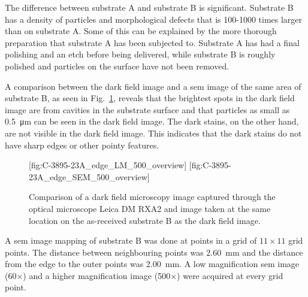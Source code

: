 The difference between substrate A and substrate B is significant. Substrate B has a density of particles and morphological defects that is 100-1000 times larger than on substrate A. Some of this can be explained by the more thorough preparation that substrate A has been subjected to. Substrate A has had a final polishing and an etch before being delivered, while substrate B is roughly polished and particles on the surface have not been removed.

A comparison between the dark field image and a \ac{sem} image of the same area of substrate B, as seen in Fig.~\ref{fig:LM_SEM_C3895}, reveals that the brightest spots in the dark field image are from cavities in the substrate surface and that particles as small as \SI{0.5}{\micro\metre} can be seen in the dark field image. The dark stains, on the other hand, are not visible in the dark field image. This indicates that the dark stains do not have sharp edges or other pointy features.

\begin{figure}[htbp]
    \centering
    [fig:C-3895-23A_edge_LM_500_overview]
    \hfill
    [fig:C-3895-23A_edge_SEM_500_overview]
    \caption[Comparison of dark field microscopy and \ac{sem} images.]{Comparison of  a dark field microscopy image captured through the optical microscope Leica DM RXA2 and   image taken at the same location on the as-received substrate B as the dark field image.}
    \label{fig:LM_SEM_C3895}
\end{figure}

A \ac{sem} image mapping of substrate B was done at points in a grid of $11\times11$ grid points. The distance between neighbouring points was \SI{2.60}{\milli\metre} and the distance from the edge to the outer points was \SI{2.00}{\milli\metre}. A low magnification \ac{sem} image (60$\times$) and a higher magnification image (500$\times$) were acquired at every grid point. %

